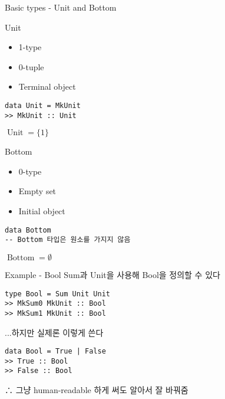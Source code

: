 \documentclass[t]{beamer}
\begin{document}
\begin{frame}[fragile]{Basic types - Unit and Bottom}
  \begin{minipage}[t]{.5\textwidth}
  \begin{block}{Unit}
    \begin{itemize}
      \item 1-type
      \item 0-tuple
      \item Terminal object
    \end{itemize}
  \end{block}
\begin{verbatim}
data Unit = MkUnit
>> MkUnit :: Unit
\end{verbatim}
  \(
    \operatorname{Unit} = \{ 1 \}
  \)
  \end{minipage}
  \begin{minipage}[t]{.45\textwidth}
    \begin{block}{Bottom}
      \begin{itemize}
        \item 0-type
        \item Empty set
        \item Initial object
      \end{itemize}
    \end{block}
\begin{verbatim}
data Bottom
-- Bottom 타입은 원소를 가지지 않음
\end{verbatim}
  \(
    \operatorname{Bottom} = \emptyset
  \)
  \end{minipage}
\end{frame}

\begin{frame}[fragile]{Example - Bool}
  Sum과 Unit을 사용해 Bool을 정의할 수 있다
\begin{verbatim}
type Bool = Sum Unit Unit
>> MkSum0 MkUnit :: Bool
>> MkSum1 MkUnit :: Bool
\end{verbatim}
  \pause
  ...하지만 실제론 이렇게 쓴다
\begin{verbatim}
data Bool = True | False
>> True :: Bool
>> False :: Bool
\end{verbatim}
  \pause
  ∴ 그냥 human-readable 하게 써도 알아서 잘 바꿔줌
\end{frame}
\end{document}
